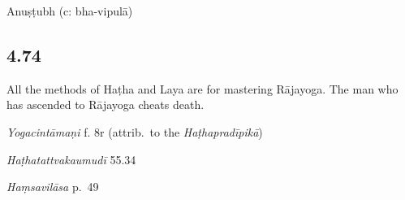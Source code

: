 \begin{ekdosis}


\begin{metre}[hp04_073]
Anuṣṭubh (c: bha-vipulā)
\end{metre}

\subsection*{4.74}
\begin{translation}[hp04_074]
All the methods of Haṭha and Laya are for mastering Rājayoga. The man who has ascended to Rājayoga cheats death.
\end{translation}


\begin{testimonia}[hp04_074]
\emph{Yogacintāmaṇi} f. 8r (attrib.~to the \emph{Haṭhapradīpikā})
\begin{versinnote}
\end{versinnote}

\emph{Haṭhatattvakaumudī} 55.34
\begin{versinnote}
\end{versinnote}

\emph{Haṃsavilāsa} p.~49
\begin{versinnote}
\end{versinnote}
\end{testimonia}



\end{ekdosis}
